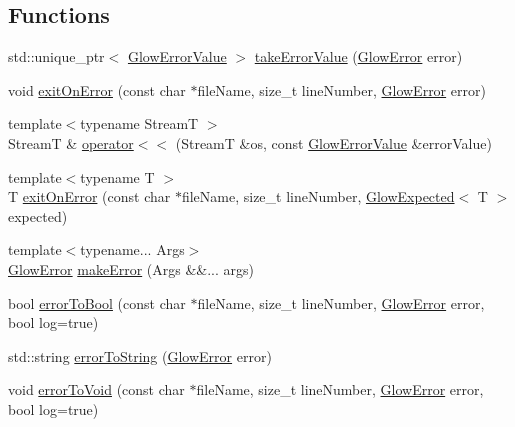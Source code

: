 \subsection*{Functions}
\begin{DoxyCompactItemize}
\item 
std\+::unique\+\_\+ptr$<$ \hyperlink{classglow_1_1detail_1_1_glow_error_value}{Glow\+Error\+Value} $>$ \hyperlink{namespaceglow_1_1detail_a9da81cdf40a87d71d6a6d3937cad18a6}{take\+Error\+Value} (\hyperlink{classglow_1_1detail_1_1_glow_error}{Glow\+Error} error)
\item 
void \hyperlink{namespaceglow_1_1detail_ab97940326641f5f16ece0eb0013348e6}{exit\+On\+Error} (const char $\ast$file\+Name, size\+\_\+t line\+Number, \hyperlink{classglow_1_1detail_1_1_glow_error}{Glow\+Error} error)
\item 
{\footnotesize template$<$typename StreamT $>$ }\\StreamT \& \hyperlink{namespaceglow_1_1detail_a523e3184bbccd0f375f59b695812f382}{operator$<$$<$} (StreamT \&os, const \hyperlink{classglow_1_1detail_1_1_glow_error_value}{Glow\+Error\+Value} \&error\+Value)
\item 
{\footnotesize template$<$typename T $>$ }\\T \hyperlink{namespaceglow_1_1detail_a2f258d44dd2a51bcbd37c3fa7ab163c7}{exit\+On\+Error} (const char $\ast$file\+Name, size\+\_\+t line\+Number, \hyperlink{classglow_1_1detail_1_1_glow_expected}{Glow\+Expected}$<$ T $>$ expected)
\item 
{\footnotesize template$<$typename... Args$>$ }\\\hyperlink{classglow_1_1detail_1_1_glow_error}{Glow\+Error} \hyperlink{namespaceglow_1_1detail_a21cb777b3cd78edbd6dc1531606590db}{make\+Error} (Args \&\&... args)
\item 
bool \hyperlink{namespaceglow_1_1detail_a01efc381cb4bbab786537b832d4c6f71}{error\+To\+Bool} (const char $\ast$file\+Name, size\+\_\+t line\+Number, \hyperlink{classglow_1_1detail_1_1_glow_error}{Glow\+Error} error, bool log=true)
\item 
std\+::string \hyperlink{namespaceglow_1_1detail_a31088d4ee87e842ac413f6029cf5bc7f}{error\+To\+String} (\hyperlink{classglow_1_1detail_1_1_glow_error}{Glow\+Error} error)
\item 
void \hyperlink{namespaceglow_1_1detail_a20b523c2b82a75da01d030784732a461}{error\+To\+Void} (const char $\ast$file\+Name, size\+\_\+t line\+Number, \hyperlink{classglow_1_1detail_1_1_glow_error}{Glow\+Error} error, bool log=true)
\end{DoxyCompactItemize}



